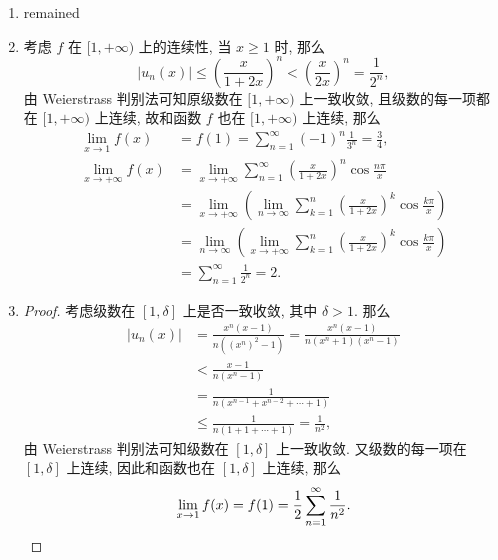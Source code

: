 \begin{enumerate}
\begin{proof}
            \[
                \lim_{x\to1}f(x) = f(1) = \ln2. \qedhere    
            \]
        \end{proof}
    \item %
        {\color{red}remained}
    \item %
        考虑 $f$ 在 $[1, +\infty)$ 上的连续性, 当 $x \geq 1$ 时, 那么
        \[
            \left|u_n(x)\right| \leq \left(\frac{x}{1+2x}\right)^n < \left(\frac{x}{2x}\right)^n = \frac{1}{2^n},    
        \]
        由 Weierstrass 判别法可知原级数在 $[1, +\infty)$ 上一致收敛, 且级数的每一项都在 $[1, +\infty)$ 上连续, 故和函数 $f$ 也在 $[1, +\infty)$ 上连续, 那么
        \begin{align*}
            \lim_{x\to1}f(x) &= f(1) = \sum_{n=1}^\infty(-1)^n\frac{1}{3^n} = \frac34, \\
            \lim_{x\to+\infty}f(x) &= \lim_{x\to+\infty}\sum_{n=1}^\infty\left(\frac{x}{1+2x}\right)^n\cos\frac{n\pi}{x} \\
            &= \lim_{x\to+\infty}\left(\lim_{n\to\infty}\sum_{k=1}^n\left(\frac{x}{1+2x}\right)^k\cos\frac{k\pi}{x}\right) \\
            &= \lim_{n\to\infty}\left(\lim_{x\to+\infty}\sum_{k=1}^n\left(\frac{x}{1+2x}\right)^k\cos\frac{k\pi}{x}\right) \\
            &= \sum_{n=1}^\infty\frac{1}{2^n} = 2.   
        \end{align*}
    \item %
        \begin{proof}
            考虑级数在 $[1, \delta]$ 上是否一致收敛, 其中 $\delta > 1$. 那么
            \begin{align*}
                |u_n(x)| &= \frac{x^n(x-1)}{n((x^n)^2-1)} = \frac{x^n(x-1)}{n(x^n+1)(x^n-1)} \\
                &< \frac{x-1}{n(x^n - 1)} \\
                &= \frac{1}{n(x^{n-1} + x^{n-2} + \cdots + 1)} \\
                &\leq \frac{1}{n(1 + 1 + \cdots + 1)} = \frac{1}{n^2},   
            \end{align*}
            由 Weierstrass 判别法可知级数在 $[1, \delta]$ 上一致收敛. 又级数的每一项在 $[1, \delta]$ 上连续, 因此和函数也在 $[1, \delta]$ 上连续, 那么
            \[
                \lim_{x\to1}f(x) = f(1) = \frac12\sum_{n=1}^\infty\frac{1}{n^2}. \qedhere    
            \]
        \end{proof}
\end{enumerate}
% 
